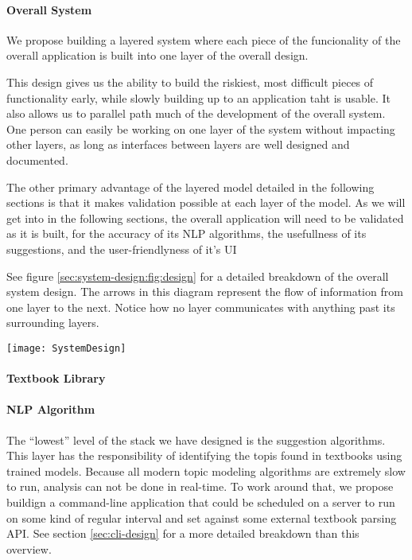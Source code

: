 \paragraph{Overall System}
We propose building a layered system where each piece of the
funcionality of the overall application is built into one layer of the
overall design.

This design gives us the ability to build the riskiest, most difficult
pieces of functionality early, while slowly building up to an
application taht is usable.
It also allows us to parallel path much of the development of the
overall system.
One person can easily be working on one layer of the system without
impacting other layers, as long as interfaces between layers are well
designed and documented.

The other primary advantage of the layered model detailed in the
following sections is that it makes validation possible at each layer
of the model.
As we will get into in the following sections, the overall application
will need to be validated as it is built, for the accuracy of its NLP
algorithms, the usefullness of its suggestions, and the
user-friendlyness of it's UI

See figure \ref{sec:system-design:fig:design} for a detailed
breakdown of the overall system design.
The arrows in this diagram represent the flow of information from one
layer to the next.
Notice how no layer communicates with anything past its surrounding layers.

\begin{figure*}[h]
\label{sec:system-design:fig:design}
\caption{Visualization of layered architecture}
\centering
\texttt{[image: SystemDesign]}
\end{figure*}

\paragraph{Textbook Library}

\paragraph{NLP Algorithm}
The ``lowest'' level of the stack we have designed is the suggestion
algorithms.
This layer has the responsibility of identifying the topis found in
textbooks using trained models.
Because all modern topic modeling algorithms are extremely slow to
run, analysis can not be done in real-time.
To work around that, we propose buildign a command-line application
that could be scheduled on a server to run on some kind of regular
interval and set against some external textbook parsing API.  
See section \ref{sec:cli-design} for a more detailed breakdown than
this overview.

